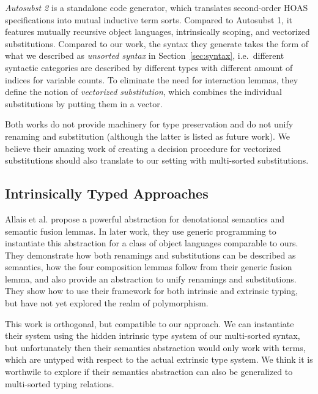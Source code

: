 \documentclass[a4paper, UKenglish, cleveref, autoref, thm-restate]{lipics-v2021}
\begin{document}
  \emph{Autosubst 2}\cite{DBLP:conf/cpp/StarkSK19} is a standalone
  code generator, which translates second-order HOAS specifications into
  mutual inductive term sorts. Compared to Autosubst 1, it features
  mutually recursive object languages, intrinsically scoping, and
  vectorized substitutions.
  Compared to our work, the syntax they generate takes the form of
  what we described as \emph{unsorted syntax} in
  Section~\ref{sec:syntax}, i.e.\ different syntactic categories are
  described by different types with different amount of indices for
  variable counts. To eliminate the need for interaction lemmas, they
  define the notion of \emph{vectorized substitution}, which combines
  the individual substitutions by putting them in a vector.
  
  Both works do not provide machinery for type preservation and do not
  unify renaming and substitution (although the latter is listed as
  future work). We believe their amazing work of creating a decision
  procedure for vectorized substitutions should also translate to our
  setting with multi-sorted substitutions.


  \subsection{Intrinsically Typed Approaches}

  Allais et al.\cite{DBLP:conf/cpp/Allais0MM17} propose a powerful
  abstraction for denotational semantics and semantic fusion lemmas.
  In later work\cite{DBLP:journals/pacmpl/AllaisA0MM18}, they use
  generic programming to instantiate this abstraction for a class of
  object languages comparable to ours.
  They demonstrate how both renamings and substitutions can be
  described as semantics, how the four composition lemmas follow from
  their generic fusion lemma, and also provide an abstraction to unify
  renamings and substitutions.
  They show how to use their framework for both intrinsic and
  extrinsic typing, but have not yet explored the realm of polymorphism.

  This work is orthogonal, but compatible to our approach.
  We can instantiate their system using the hidden intrinsic type
  system of our multi-sorted syntax, but unfortunately then their
  semantics abstraction would only work with terms, which are untyped
  with respect to the actual extrinsic type system.
  We think it is worthwile to explore if their semantics abstraction
  can also be generalized to multi-sorted typing relations.
\end{document}
